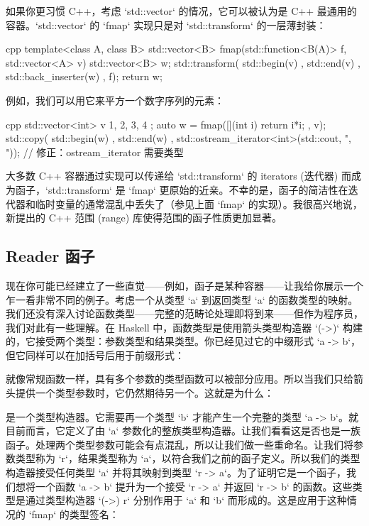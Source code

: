 如果你更习惯 C++，考虑 `std::vector` 的情况，它可以被认为是 C++ 最通用的容器。`std::vector` 的 `fmap` 实现只是对 `std::transform` 的一层薄封装：

\begin{snip}{cpp}
template<class A, class B>
std::vector<B> fmap(std::function<B(A)> f, std::vector<A> v) {
    std::vector<B> w;
    std::transform( std::begin(v)
                  , std::end(v)
                  , std::back_inserter(w)
                  , f);
    return w;
}
\end{snip}
例如，我们可以用它来平方一个数字序列的元素：

\begin{snip}{cpp}
std::vector<int> v{ 1, 2, 3, 4 };
auto w = fmap([](int i) { return i*i; }, v);
std::copy( std::begin(w)
         , std::end(w)
         , std::ostream_iterator<int>(std::cout, ", ")); // 修正：ostream_iterator 需要类型
\end{snip}
大多数 C++ 容器通过实现可以传递给 `std::transform` 的 iterators (迭代器) 而成为函子，`std::transform` 是 `fmap` 更原始的近亲。不幸的是，函子的简洁性在迭代器和临时变量的通常混乱中丢失了（参见上面 `fmap` 的实现）。我很高兴地说，新提出的 C++ 范围 (range) 库使得范围的函子性质更加显著。

\subsection{Reader 函子}

现在你可能已经建立了一些直觉——例如，函子是某种容器——让我给你展示一个乍一看非常不同的例子。考虑一个从类型 `a` 到返回类型 `a` 的函数类型的映射。我们还没有深入讨论函数类型——完整的范畴论处理即将到来——但作为程序员，我们对此有一些理解。在 Haskell 中，函数类型是使用箭头类型构造器 `(->)` 构建的，它接受两个类型：参数类型和结果类型。你已经见过它的中缀形式 `a -> b`，但它同样可以在加括号后用于前缀形式：

就像常规函数一样，具有多个参数的类型函数可以被部分应用。所以当我们只给箭头提供一个类型参数时，它仍然期待另一个。这就是为什么：

是一个类型构造器。它需要再一个类型 `b` 才能产生一个完整的类型 `a -> b`。就目前而言，它定义了由 `a` 参数化的整族类型构造器。让我们看看这是否也是一族函子。处理两个类型参数可能会有点混乱，所以让我们做一些重命名。让我们将参数类型称为 `r`，结果类型称为 `a`，以符合我们之前的函子定义。所以我们的类型构造器接受任何类型 `a` 并将其映射到类型 `r -> a`。为了证明它是一个函子，我们想将一个函数 `a -> b` 提升为一个接受 `r -> a` 并返回 `r -> b` 的函数。这些类型是通过类型构造器 `(->) r` 分别作用于 `a` 和 `b` 而形成的。这是应用于这种情况的 `fmap` 的类型签名：

